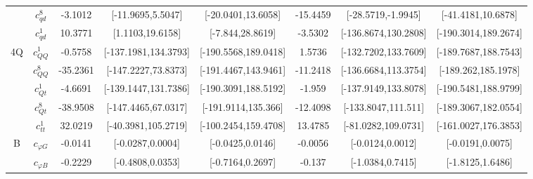 \documentclass{article}
\begin{document}
\begin{table}[H]
\begin{tabular}{|c|c|c|c|c|c|c|c|}
 & $c_{qd}^{8}$ & -3.1012                             & [-11.9695,5.5047]                                 & [-20.0401,13.6058] & -15.4459                             & [-28.5719,-1.9945]                                 & [-41.4181,10.6878] \\ \cline{2-8}
 & $c_{qd}^{1}$ & 10.3771                             & [1.1103,19.6158]                                 & [-7.844,28.8619] & -3.5302                             & [-136.8674,130.2808]                                 & [-190.3014,189.2674] \\ \cline{2-8}
\hline
\multirow{5}{*}{4Q}
 & $c_{QQ}^{1}$ & -0.5758                             & [-137.1981,134.3793]                                 & [-190.5568,189.0418] & 1.5736                             & [-132.7202,133.7609]                                 & [-189.7687,188.7543] \\ \cline{2-8}
 & $c_{QQ}^{8}$ & -35.2361                             & [-147.2227,73.8373]                                 & [-191.4467,143.9461] & -11.2418                             & [-136.6684,113.3754]                                 & [-189.262,185.1978] \\ \cline{2-8}
 & $c_{Qt}^{1}$ & -4.6691                             & [-139.1447,131.7386]                                 & [-190.3091,188.5192] & -1.959                             & [-137.9149,133.8078]                                 & [-190.5481,188.9799] \\ \cline{2-8}
 & $c_{Qt}^{8}$ & -38.9508                             & [-147.4465,67.0317]                                 & [-191.9114,135.366] & -12.4098                             & [-133.8047,111.511]                                 & [-189.3067,182.0554] \\ \cline{2-8}
 & $c_{tt}^{1}$ & 32.0219                             & [-40.3981,105.2719]                                 & [-100.2454,159.4708] & 13.4785                             & [-81.0282,109.0731]                                 & [-161.0027,176.3853] \\ \cline{2-8}
\hline
\multirow{7}{*}{B}
 & $c_{\varphi G}$ & -0.0141                             & [-0.0287,0.0004]                                 & [-0.0425,0.0146] & -0.0056                             & [-0.0124,0.0012]                                 & [-0.0191,0.0075] \\ \cline{2-8}
 & $c_{\varphi B}$ & -0.2229                             & [-0.4808,0.0353]                                 & [-0.7164,0.2697] & -0.137                             & [-1.0384,0.7415]                                 & [-1.8125,1.6486] \\ \cline{2-8}

\end{tabular}
\end{table}
\end{document}
